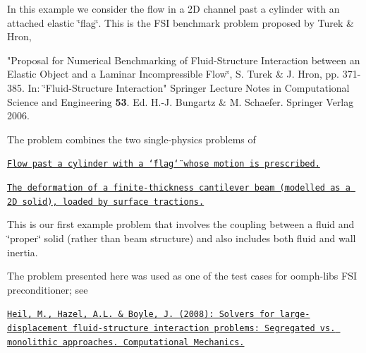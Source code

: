 In this example we consider the flow in a 2D channel past a cylinder with an attached elastic \char`\"{}flag\char`\"{}. This is the F\+SI benchmark problem proposed by Turek \& Hron, \begin{center} "Proposal for Numerical Benchmarking of Fluid-\/\+Structure Interaction between an Elastic Object and a Laminar Incompressible Flow\char`\"{}, S. Turek \& J. Hron, pp. 371-\/385. In\+: 
\char`\"{}Fluid-\/\+Structure Interaction" Springer Lecture Notes in Computational Science and Engineering {\bfseries 53}. Ed. H.-\/J. Bungartz \& M. Schaefer. Springer Verlag 2006. \end{center} 

The problem combines the two single-\/physics problems of ~\newline
~\newline

\begin{DoxyItemize}
\item \href{../../../navier_stokes/turek_flag_non_fsi/html/index.html}{\tt Flow past a cylinder with a \char`\"{}flag\char`\"{} whose motion is prescribed.} ~\newline
~\newline

\item \href{../../../solid/airy_cantilever/html/index.html}{\tt The deformation of a finite-\/thickness cantilever beam (modelled as a 2D solid), loaded by surface tractions.} ~\newline
~\newline

\end{DoxyItemize}This is our first example problem that involves the coupling between a fluid and \char`\"{}proper\char`\"{} solid (rather than beam structure) and also includes both fluid and wall inertia.

The problem presented here was used as one of the test cases for {\ttfamily oomph-\/lib\textquotesingle{}s} F\+SI preconditioner; see ~\newline
~\newline
 \begin{center} \href{http://www.maths.man.ac.uk/~mheil/oomph_lib_additional_material/HeilHazelBoyleCompMech/HeilHazelBoyleCompMech.pdf}{\tt Heil, M., Hazel, A.\+L. \& Boyle, J. (2008)\+: Solvers for large-\/displacement fluid-\/structure interaction problems\+: Segregated vs. monolithic approaches. Computational Mechanics.} \end{center} 

